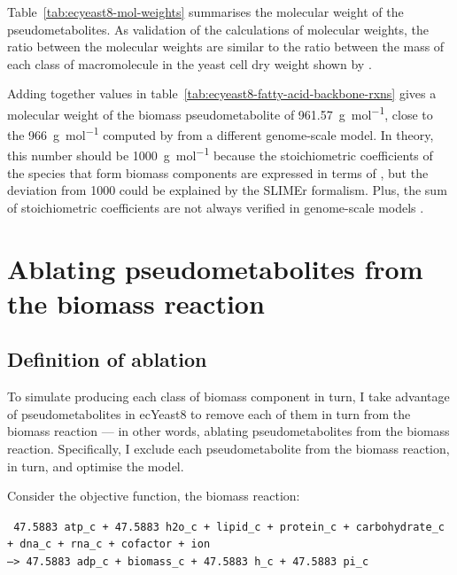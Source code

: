 Table~\ref{tab:ecyeast8-mol-weights} summarises the molecular weight of the pseudometabolites.
As validation of the calculations of molecular weights, the ratio between the molecular weights are similar to the ratio between the mass of each class of macromolecule in the yeast cell dry weight shown by \textcite{canelasVivoDatadrivenFramework2011}.

Adding together values in table~\ref{tab:ecyeast8-fatty-acid-backbone-rxns} gives a  molecular weight of the biomass pseudometabolite of \SI{961.57}{\gram~\mol^{-1}}, close to the \SI{966}{\gram~\mol^{-1}} computed by \textcite{takhaveevTemporalSegregationBiosynthetic2023} from a different genome-scale model.
In theory, this number should be \SI{1000}{\gram~\mol^{-1}} because the stoichiometric coefficients of the species that form biomass components are expressed in terms of \SI{}{\mmolgdw} \parencite{thieleProtocolGeneratingHighquality2010, palssonSystemsBiologyConstraintbased2015}, but the deviation from 1000 could be explained by the SLIMEr formalism.
Plus, the sum of stoichiometric coefficients are not always verified in genome-scale models \parencite{chanStandardizingBiomassReactions2017}.


\section{Ablating pseudometabolites from the biomass reaction}
\label{sec:model-yeast8-pseudometabolites}

\subsection{Definition of ablation}
\label{sec:model-yeast8-pseudometabolites-def}

To simulate producing each class of biomass component in turn,
I take advantage of pseudometabolites in ecYeast8 to remove each of them in turn from the biomass reaction ---
in other words, ablating pseudometabolites from the biomass reaction.
Specifically, I exclude each pseudometabolite from the biomass reaction, in turn, and optimise the model.

Consider the objective function, the biomass reaction:

\texttt{
  47.5883 atp\_c + 47.5883 h2o\_c + lipid\_c + protein\_c + carbohydrate\_c\\
  + dna\_c + rna\_c + cofactor + ion \\
  --> 47.5883 adp\_c + biomass\_c + 47.5883 h\_c + 47.5883 pi\_c
}

